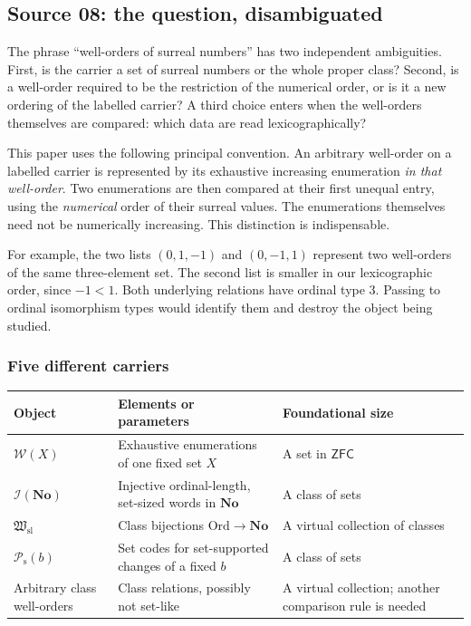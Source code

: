 \documentclass[11pt]{article}
\theoremstyle{definition}
\theoremstyle{remark}
\newcommand{\No}{\mathbf{No}}
\newcommand{\Ord}{\mathrm{Ord}}
\newcommand{\W}{\mathcal W}
\newcommand{\I}{\mathcal I}
\newcommand{\Hsl}{\mathfrak W_{\mathrm{sl}}}
\newcommand{\Psupp}{\mathcal P_{\mathrm{s}}}
\newcommand{\ZFC}{\mathsf{ZFC}}
\begin{document}
\subsection{Source 08: the question, disambiguated}\label{swo:sk:sec:question}

The phrase ``well-orders of surreal numbers'' has two independent
ambiguities. First, is the carrier a set of surreal numbers or the whole
proper class? Second, is a well-order required to be the restriction of
the numerical order, or is it a new ordering of the labelled carrier?
A third choice enters when the well-orders themselves are compared:
which data are read lexicographically?

This paper uses the following principal convention. An arbitrary
well-order on a labelled carrier is represented by its exhaustive
increasing enumeration \emph{in that well-order}. Two enumerations are
then compared at their first unequal entry, using the \emph{numerical}
order of their surreal values. The enumerations themselves need not be
numerically increasing. This distinction is indispensable.

For example, the two lists $(0,1,-1)$ and $(0,-1,1)$ represent two
well-orders of the same three-element set. The second list is smaller in
our lexicographic order, since $-1<1$. Both underlying relations have
ordinal type $3$. Passing to ordinal isomorphism types would identify
them and destroy the object being studied.

\subsubsection{Five different carriers}

\begin{center}
\small
\begin{tabularx}{\textwidth}{@{}p{}Y Y@{}}
\toprule
Object & Elements or parameters & Foundational size \\
\midrule
$\W(X)$ & Exhaustive enumerations of one fixed set $X$ & A set in $\ZFC$ \\
$\I(\No)$ & Injective ordinal-length, set-sized words in $\No$ & A class of sets \\
$\Hsl$ & Class bijections $\Ord\to\No$ & A virtual collection of classes \\
$\Psupp(b)$ & Set codes for set-supported changes of a fixed $b$ & A class of sets \\
Arbitrary class well-orders & Class relations, possibly not set-like & A virtual collection; another comparison rule is needed \\
\bottomrule
\end{tabularx}
\end{center}
\end{document}
